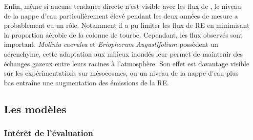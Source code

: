 Enfin, même si aucune tendance directe n'est visible avec les flux de \coo, le niveau de la nappe d'eau particulièrement élevé pendant les deux années de mesure a probablement eu un rôle.
Notamment il a pu limiter les flux de RE en minimisant la proportion aérobie de la colonne de tourbe.
Cependant, les flux observés sont important.
\textit{Molinia caerulea} et \textit{Eriophorum Augustifolium} possèdent un aérenchyme, cette adaptation aux milieux inondés leur permet de maintenir des échanges gazeux entre leurs racines à l'atmosphère.
Son effet est davantage visible sur les expérimentations sur mésocosmes, ou un niveau de la nappe d'eau plus bas entraîne une augmentation des émissions de la RE.



\subsection*{Les modèles}

\subsubsection{Intérêt de l'évaluation}


